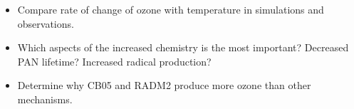 \begin{BlueBox}
    \vskip-1cm
    \begin{block}{}
        \begin{itemize}
            \item Compare rate of change of ozone with temperature in simulations and observations. \vspace{10mm}
            \item Which aspects of the increased chemistry is the most important? Decreased PAN lifetime? Increased radical production? \vspace{10mm}
            \item Determine why CB05 and RADM2 produce more ozone than other mechanisms. \vspace{10mm}
        \end{itemize}        
    \end{block}
\end{BlueBox}
